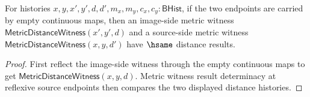 \begin{theorem}
\label{thm:continuousmap-empty-identity-metric-result-deterministic}
For histories $x,y,x',y',d,d',m_x,m_y,c_x,c_y:\mathsf{BHist}$, if the two
endpoints are carried by empty continuous maps, then an image-side metric
witness $\mathsf{MetricDistanceWitness}(x',y',d)$ and a source-side metric
witness $\mathsf{MetricDistanceWitness}(x,y,d')$ have $\hsame$ distance
results.
\end{theorem}
\begin{proof}
First reflect the image-side witness through the empty continuous maps to get
$\mathsf{MetricDistanceWitness}(x,y,d)$. Metric witness result determinacy at
reflexive source endpoints then compares the two displayed distance histories.
\end{proof}
